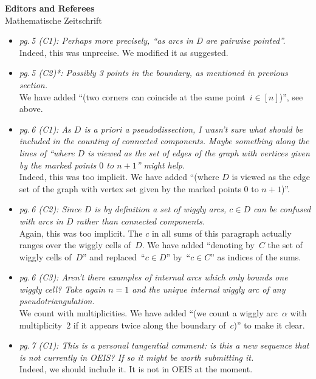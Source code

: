 \documentclass{letter}
\begin{document}
\begin{letter}{{\bf Editors and Referees} \\ Mathematische Zeitschrift}
\begin{itemize}
\item \textsl{\color{gray} pg.\,5 (C1): Perhaps more precisely, ``as arcs in D are pairwise pointed''.} \\
Indeed, this was unprecise. We modified it as suggested.

\item \textsl{\color{gray} pg.\,5 (C2)*: Possibly 3 points in the boundary, as mentioned in previous section.} \\
We have added ``(two corners can coincide at the same point~$i \in [n]$)'', see above.

\item \textsl{\color{gray} pg.\,6 (C1): As $D$ is a priori a pseudodissection, I wasn't sure what should be included in the counting of connected components. Maybe something along the lines of ``where $D$ is viewed as the set of edges of the graph with vertices given by the marked points $0$ to $n+1$'' might help.} \\
Indeed, this was too implicit. We have added ``(where $D$ is viewed as the edge set of the graph with vertex set given by the marked points $0$ to $n+1$)''.

\item \textsl{\color{gray} pg.\,6 (C2): Since $D$ is by definition a set of wiggly arcs, $c \in D$ can be confused with arcs in $D$ rather than connected components.} \\
Again, this was too implicit. The $c$ in all sums of this paragraph actually ranges over the wiggly cells of~$D$. We have added ``denoting by~$C$ the set of wiggly cells of~$D$'' and replaced~``$c \in D$'' by~``$c \in C$'' as indices of the sums.

\item \textsl{\color{gray} pg.\,6 (C3): Aren’t there examples of internal arcs which only bounds one wiggly cell? Take again $n = 1$ and the unique internal wiggly arc of any pseudotriangulation.} \\
We count with multiplicities. We have added ``(we count a wiggly arc~$\alpha$ with multiplicity~$2$ if it appears twice along the boundary of~$c$)'' to make it clear.

\item \textsl{\color{gray} pg.\,7 (C1): This is a personal tangential comment: is this a new sequence that is not currently in OEIS? If so it might be worth submitting it.} \\
Indeed, we should include it. It is not in OEIS at the moment.


\end{itemize}
\end{letter}
\end{document}
